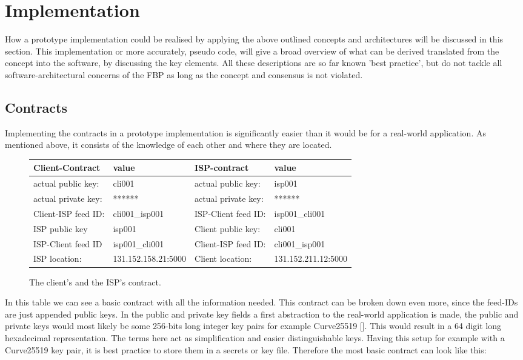 \chapter{Implementation}
How a prototype implementation could be realised by applying the above outlined concepts and architectures will be discussed in this section. This implementation or more accurately, pseudo code, will give a broad overview of what can be derived translated from the concept into the software, by discussing the key elements. All these descriptions are so far known 'best practice', but do not tackle all software-architectural concerns of the FBP as long as the concept and consensus is not violated.
\section{Contracts}
Implementing the contracts in a prototype implementation is significantly easier than it would be for a real-world application. As mentioned above, it consists of the knowledge of each other and where they are located.
\begin{figure}
    
    \begin{center}
        \begin{tabular}{llll} \toprule
            Client-Contract&value&ISP-contract&value\\ \midrule
            actual public key:& cli001 &  actual public key: &isp001  \\ 
            actual private key:& ****** & actual private key:& ****** \\
            Client-ISP feed ID:& cli001\_isp001 &ISP-Client feed ID:&isp001\_cli001 \\ 
            ISP public key&isp001&Client public key:&cli001\\
            ISP-Client feed ID&isp001\_cli001&Client-ISP feed ID:&cli001\_isp001\\
            ISP location:&131.152.158.21:5000 &Client location:& 131.152.211.12:5000 \\\bottomrule
        \end{tabular}
    \end{center}
    \caption{The client's and the ISP's contract.}
\end{figure}

In this table we can see a basic contract with all the information needed. This contract can be broken down even more, since the feed-IDs are just appended public keys. In the public and private key fields a first abstraction to the real-world application is made, the public and private keys would most likely be some 256-bits long integer key pairs for example Curve25519 []. This would result in a 64 digit long hexadecimal representation. The terms here act as simplification and easier distinguishable keys. Having this setup for example with a Curve25519 key pair, it is best practice to store them in a secrets or key file. Therefore the most basic contract can look like this:

